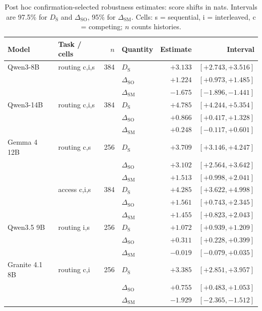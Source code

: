 \begin{table}[t]
\centering
\small
\setlength{\tabcolsep}{5pt}
\begin{tabular}{@{}llrlrr@{}}
\toprule
Model & Task / cells & $n$ & Quantity & Estimate & Interval \\
\midrule
Qwen3-8B & routing c,i,s & 384 & $D_{\mathrm{S}}$ & $+3.133$ & $[+2.743, +3.516]$ \\
 &  &  & $\Delta_{\mathrm{SO}}$ & $+1.224$ & $[+0.973, +1.485]$ \\
 &  &  & $\Delta_{\mathrm{SM}}$ & $-1.675$ & $[-1.896, -1.441]$ \\
\midrule
Qwen3-14B & routing c,i,s & 384 & $D_{\mathrm{S}}$ & $+4.785$ & $[+4.244, +5.354]$ \\
 &  &  & $\Delta_{\mathrm{SO}}$ & $+0.866$ & $[+0.417, +1.328]$ \\
 &  &  & $\Delta_{\mathrm{SM}}$ & $+0.248$ & $[-0.117, +0.601]$ \\
\midrule
Gemma 4 12B & routing c,s & 256 & $D_{\mathrm{S}}$ & $+3.709$ & $[+3.146, +4.247]$ \\
 &  &  & $\Delta_{\mathrm{SO}}$ & $+3.102$ & $[+2.564, +3.642]$ \\
 &  &  & $\Delta_{\mathrm{SM}}$ & $+1.513$ & $[+0.998, +2.041]$ \\
 & access c,i,s & 384 & $D_{\mathrm{S}}$ & $+4.285$ & $[+3.622, +4.998]$ \\
 &  &  & $\Delta_{\mathrm{SO}}$ & $+1.561$ & $[+0.743, +2.345]$ \\
 &  &  & $\Delta_{\mathrm{SM}}$ & $+1.455$ & $[+0.823, +2.043]$ \\
\midrule
Qwen3.5 9B & routing i,s & 256 & $D_{\mathrm{S}}$ & $+1.072$ & $[+0.939, +1.209]$ \\
 &  &  & $\Delta_{\mathrm{SO}}$ & $+0.311$ & $[+0.228, +0.399]$ \\
 &  &  & $\Delta_{\mathrm{SM}}$ & $-0.019$ & $[-0.079, +0.035]$ \\
\midrule
Granite 4.1 8B & routing c,i & 256 & $D_{\mathrm{S}}$ & $+3.385$ & $[+2.851, +3.957]$ \\
 &  &  & $\Delta_{\mathrm{SO}}$ & $+0.755$ & $[+0.483, +1.053]$ \\
 &  &  & $\Delta_{\mathrm{SM}}$ & $-1.929$ & $[-2.365, -1.512]$ \\
\bottomrule
\end{tabular}
\caption{Post hoc confirmation-selected robustness estimates: score shifts in nats. Intervals are 97.5\% for $D_{\mathrm{S}}$ and $\Delta_{\mathrm{SO}}$, 95\% for $\Delta_{\mathrm{SM}}$. Cells: s = sequential, i = interleaved, c = competing; $n$ counts histories.}
\label{tab:cross-model-confirmation}
\end{table}


